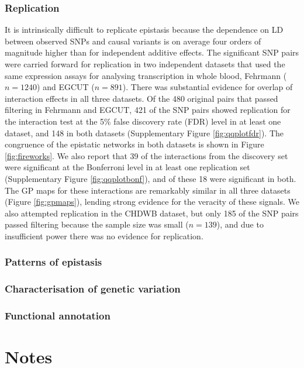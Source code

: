 \documentclass{article}
\begin{document}
\subsubsection{Replication}
It is intrinsically difficult to replicate epistasis because the dependence on LD between observed SNPs and causal variants is on average four orders of magnitude higher than for independent additive effects. The significant SNP pairs were carried forward for replication in two independent datasets that used the same expression assays for analysing transcription in whole blood, Fehrmann ($n=1240$) and EGCUT ($n=891$). There was substantial evidence for overlap of interaction effects in all three datasets. Of the 480 original pairs that passed filtering in Fehrmann and EGCUT, 421 of the SNP pairs showed replication for the interaction test at the 5\% false discovery rate (FDR) level in at least one dataset, and 148 in both datasets (Supplementary Figure \ref{fig:qqplotfdr}). The congruence of the epistatic networks in both datasets is shown in Figure \ref{fig:fireworks}. We also report that 39 of the interactions from the discovery set were significant at the Bonferroni level in at least one replication set (Supplementary Figure \ref{fig:qqplotbonf}), and of these 18 were significant in both. The GP maps for these interactions are remarkably similar in all three datasets (Figure \ref{fig:gpmaps}), lending strong evidence for the veracity of these signals. We also attempted replication in the CHDWB dataset, but only 185 of the SNP pairs passed filtering because the sample size was small ($n=139$), and due to insufficient power there was no evidence for replication.


\subsubsection{Patterns of epistasis}



\subsubsection{Characterisation of genetic variation}



\subsubsection{Functional annotation}



\section{Notes}
\end{document}
